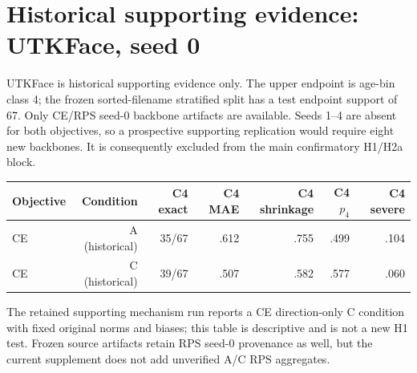 \section{Historical supporting evidence: UTKFace, seed 0}

UTKFace is historical supporting evidence only. The upper endpoint is age-bin
class 4; the frozen sorted-filename stratified split has a test endpoint support
of 67. Only CE/RPS seed-0 backbone artifacts are available. Seeds 1--4 are
absent for both objectives, so a prospective supporting replication would
require eight new backbones. It is consequently excluded from the main
confirmatory H1/H2a block.

\begin{center}
\begin{tabular}{lrrrrrr}
\toprule
Objective & Condition & C4 exact & C4 MAE & C4 shrinkage & C4 $p_4$ & C4 severe \\
\midrule
CE & A (historical) & 35/67 & .612 & .755 & .499 & .104 \\
CE & C (historical) & 39/67 & .507 & .582 & .577 & .060 \\
\bottomrule
\end{tabular}
\end{center}

The retained supporting mechanism run reports a CE direction-only C condition
with fixed original norms and biases; this table is descriptive and is not a
new H1 test. Frozen source artifacts retain RPS seed-0 provenance as well, but
the current supplement does not add unverified A/C RPS aggregates.

